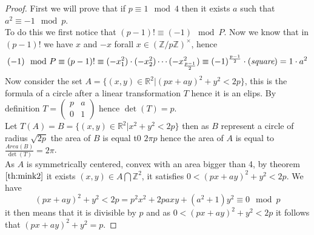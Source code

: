 \documentclass[a4paper,11pt,american]{article}
\newcommand{\R}{\mathbb{R}}
\newcommand{\Z}{\mathbb{Z}}
\theoremstyle{plain}
\theoremstyle{definition}
\begin{document}
\begin{proof}
    First we will prove that if $p\equiv 1\mod 4$ then it exists $a$ such that $a^2\equiv -1 \mod p$.\\
    To do this we first notice that $(p-1)!\equiv (-1)\mod P$. Now 
    we know that in $(p-1)!$ we have $x$ and $-x$ forall $x\in (\Z/p\Z)^{\times}$, hence $$(-1)\mod P\equiv(p-1)!\equiv (-x_1^2)\cdot(-x_2^2)\cdots(-x^2_{\frac{p-1}{2}})\equiv (-1)^{\frac{p-1}{2}}\cdot(\emph{square})=1\cdot a^2$$
    Now consider the set $A=\{(x,y)\in\R^2\vert(px+ay)^2+y^2<2p\}$, this is the formula of a circle after a linear transformation $T$ hence it is an elips. By definition $T=\begin{pmatrix}
        p & a  \\
        0 & 1  
      \end{pmatrix} $ hence $\det(T)=p$.\\
      Let $T(A)=B=\{(x,y)\in\R^2\vert x^2+y^2<2p\}$ then as $B$ represent a circle of radius $\sqrt{2p}$ the area of $B$ is equal t0 $2\pi p$ hence the area of $A$ is equal to $\frac{Area(B)}{\det(T)}=2\pi$.\\
      As $A$ is symmetrically centered, convex with an area bigger than 4, by theorem $\eqref{th:mink2}$ it exists $(x,y)\in A\bigcap\Z^2$, it satisfies $0<(px+ay)^2+y^2<2p$.
      We have $$(px+ay)^2+y^2<2p=p^2x^2+2paxy+(a^2+1)y^2\equiv0\mod p$$ it then means that it is divisible by $p$ and as $0<(px+ay)^2+y^2<2p$ it follows that $(px+ay)^2+y^2=p$.
\end{proof}
\end{document}
